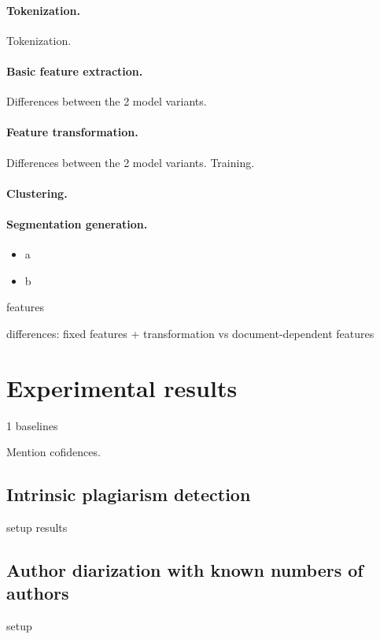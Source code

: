 \documentclass[10pt, a4paper]{article}
\begin{document}
\paragraph{Tokenization.} Tokenization.

\paragraph{Basic feature extraction.} Differences between the 2 model variants.

\paragraph{Feature transformation.} Differences between the 2 model variants. Training.

\paragraph{Clustering.}

\paragraph{Segmentation generation.}

\begin{itemize}
\item a
\item b
\end{itemize}

features

differences: fixed features + transformation vs document-dependent features

\section{Experimental results}

1
baselines

Mention cofidences.

\subsection{Intrinsic plagiarism detection}

setup
results

\subsection{Author diarization with known numbers of authors}

setup
\end{document}
